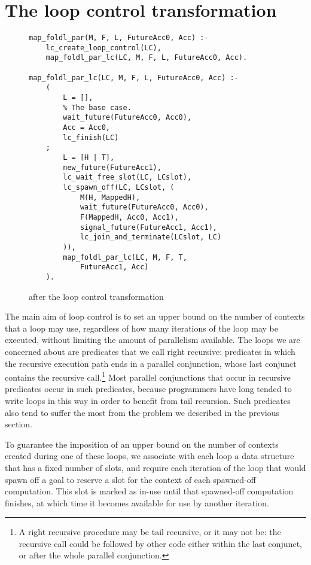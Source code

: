 \section{The loop control transformation}
\label{sec:transformation}

\begin{figure}[tb]
\begin{verbatim}
map_foldl_par(M, F, L, FutureAcc0, Acc) :-
    lc_create_loop_control(LC),
    map_foldl_par_lc(LC, M, F, L, FutureAcc0, Acc).

map_foldl_par_lc(LC, M, F, L, FutureAcc0, Acc) :-
    (
        L = [],
        % The base case.
        wait_future(FutureAcc0, Acc0),
        Acc = Acc0,
        lc_finish(LC)
    ;
        L = [H | T],
        new_future(FutureAcc1),
        lc_wait_free_slot(LC, LCslot),
        lc_spawn_off(LC, LCslot, (
            M(H, MappedH),
            wait_future(FutureAcc0, Acc0),
            F(MappedH, Acc0, Acc1),
            signal_future(FutureAcc1, Acc1),
            lc_join_and_terminate(LCslot, LC)
        )),
        map_foldl_par_lc(LC, M, F, T,
            FutureAcc1, Acc)
    ).
\end{verbatim}
\caption{\mapfoldl{} after the loop control transformation}
\label{fig:map_foldl_transformed}
\end{figure}

The main aim of loop control is to set an upper bound
on the number of contexts that a loop may use,
regardless of how many iterations of the loop may be executed,
without limiting the amount of parallelism available.
The loops we are concerned about
are predicates that we call right recursive:
predicates in which the recursive execution path
ends in a parallel conjunction,
whose last conjunct contains the recursive call.\footnote{
A right recursive procedure may be tail recursive, or it may not be:
the recursive call could be followed by other code
either within the last conjunct, or after the whole parallel conjunction.}
Most parallel conjunctions that occur in recursive predicates
occur in such predicates,
because programmers have long tended to write loops in this way
in order to benefit from tail recursion.
Such predicates also tend to
suffer the most from the problem we described in the previous section.

To guarantee the imposition of an upper bound
on the number of contexts created during one of these loops,
we associate with each loop a data structure
that has a fixed number of slots,
and require each iteration of the loop that would spawn off a goal
to reserve a slot for the context of each spawned-off computation.
This slot is marked as in-use until that spawned-off computation finishes,
at which time it becomes available for use by another iteration.

